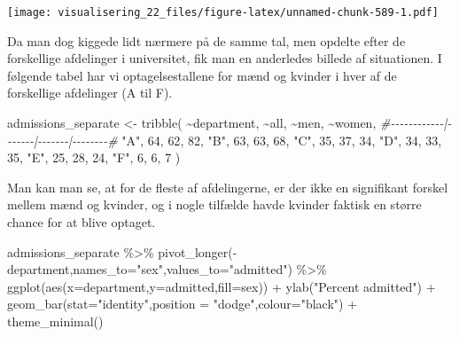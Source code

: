 \documentclass[
]{book}
\newenvironment{Shaded}{\begin{snugshade}}{\end{snugshade}}
\newcommand{\AttributeTok}[1]{\textcolor[rgb]{0.77,0.63,0.00}{#1}}
\newcommand{\CommentTok}[1]{\textcolor[rgb]{0.56,0.35,0.01}{\textit{#1}}}
\newcommand{\DecValTok}[1]{\textcolor[rgb]{0.00,0.00,0.81}{#1}}
\newcommand{\FunctionTok}[1]{\textcolor[rgb]{0.00,0.00,0.00}{#1}}
\newcommand{\NormalTok}[1]{#1}
\newcommand{\OtherTok}[1]{\textcolor[rgb]{0.56,0.35,0.01}{#1}}
\newcommand{\SpecialCharTok}[1]{\textcolor[rgb]{0.00,0.00,0.00}{#1}}
\newcommand{\StringTok}[1]{\textcolor[rgb]{0.31,0.60,0.02}{#1}}
\begin{document}
\texttt{[image: visualisering\_22\_files/figure-latex/unnamed-chunk-589-1.pdf]}

Da man dog kiggede lidt nærmere på de samme tal, men opdelte efter de forskellige afdelinger i universitet, fik man en anderledes billede af situationen. I følgende tabel har vi optagelsestallene for mænd og kvinder i hver af de forskellige afdelinger (A til F).

\begin{Shaded}
\begin{Highlighting}[]
\NormalTok{admissions\_separate }\OtherTok{\textless{}{-}} \FunctionTok{tribble}\NormalTok{(}
  \SpecialCharTok{\textasciitilde{}}\NormalTok{department,   }\SpecialCharTok{\textasciitilde{}}\NormalTok{all,   }\SpecialCharTok{\textasciitilde{}}\NormalTok{men,  }\SpecialCharTok{\textasciitilde{}}\NormalTok{women,}
  \CommentTok{\#{-}{-}{-}{-}{-}{-}{-}{-}{-}{-}{-}{-}|{-}{-}{-}{-}{-}{-}{-}|{-}{-}{-}{-}{-}{-}{-}|{-}{-}{-}{-}{-}{-}{-}{-}\#}
  \StringTok{"A"}\NormalTok{,            }\DecValTok{64}\NormalTok{,     }\DecValTok{62}\NormalTok{,      }\DecValTok{82}\NormalTok{,}
  \StringTok{"B"}\NormalTok{,            }\DecValTok{63}\NormalTok{,     }\DecValTok{63}\NormalTok{,      }\DecValTok{68}\NormalTok{,}
  \StringTok{"C"}\NormalTok{,            }\DecValTok{35}\NormalTok{,     }\DecValTok{37}\NormalTok{,      }\DecValTok{34}\NormalTok{,}
  \StringTok{"D"}\NormalTok{,            }\DecValTok{34}\NormalTok{,     }\DecValTok{33}\NormalTok{,      }\DecValTok{35}\NormalTok{,}
  \StringTok{"E"}\NormalTok{,            }\DecValTok{25}\NormalTok{,     }\DecValTok{28}\NormalTok{,      }\DecValTok{24}\NormalTok{,}
  \StringTok{"F"}\NormalTok{,             }\DecValTok{6}\NormalTok{,      }\DecValTok{6}\NormalTok{,       }\DecValTok{7}
\NormalTok{)}
\end{Highlighting}
\end{Shaded}

Man kan man se, at for de fleste af afdelingerne, er der ikke en signifikant forskel mellem mænd og kvinder, og i nogle tilfælde havde kvinder faktisk en større chance for at blive optaget.

\begin{Shaded}
\begin{Highlighting}[]
\NormalTok{admissions\_separate }\SpecialCharTok{\%\textgreater{}\%} 
  \FunctionTok{pivot\_longer}\NormalTok{(}\SpecialCharTok{{-}}\NormalTok{department,}\AttributeTok{names\_to=}\StringTok{"sex"}\NormalTok{,}\AttributeTok{values\_to=}\StringTok{"admitted"}\NormalTok{) }\SpecialCharTok{\%\textgreater{}\%}
  \FunctionTok{ggplot}\NormalTok{(}\FunctionTok{aes}\NormalTok{(}\AttributeTok{x=}\NormalTok{department,}\AttributeTok{y=}\NormalTok{admitted,}\AttributeTok{fill=}\NormalTok{sex)) }\SpecialCharTok{+} 
  \FunctionTok{ylab}\NormalTok{(}\StringTok{"Percent admitted"}\NormalTok{) }\SpecialCharTok{+}
  \FunctionTok{geom\_bar}\NormalTok{(}\AttributeTok{stat=}\StringTok{"identity"}\NormalTok{,}\AttributeTok{position =} \StringTok{"dodge"}\NormalTok{,}\AttributeTok{colour=}\StringTok{"black"}\NormalTok{) }\SpecialCharTok{+} 
  \FunctionTok{theme\_minimal}\NormalTok{()}
\end{Highlighting}
\end{Shaded}
\end{document}

